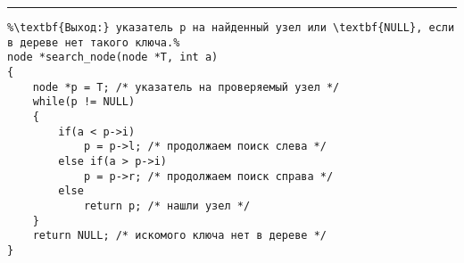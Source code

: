 \vspace{5pt} \hrule
\begin{lstlisting}[caption={Поиск узла в дереве сортировки}, label=p316_search_node, escapechar=\%]
%\noindent\textbf{Вход:} дерево сортировки T, заданное указателем на корень; ключ a: key.\\%
%\textbf{Выход:} указатель p на найденный узел или \textbf{NULL}, если в дереве нет такого ключа.%
node *search_node(node *T, int a)
{
	node *p = T; /* указатель на проверяемый узел */
	while(p != NULL)
	{
		if(a < p->i)
			p = p->l; /* продолжаем поиск слева */
		else if(a > p->i)
			p = p->r; /* продолжаем поиск справа */
		else
			return p; /* нашли узел */
	}
	return NULL; /* искомого ключа нет в дереве */
}
\end{lstlisting}
